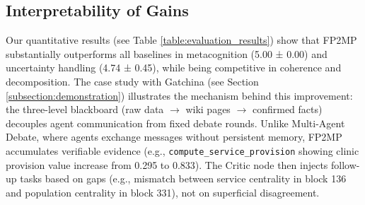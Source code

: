 \subsection{Interpretability of Gains}

Our quantitative results (see Table \ref{table:evaluation_results}) show that FP2MP substantially outperforms all baselines in metacognition (5.00 ± 0.00) and uncertainty handling (4.74 ± 0.45), while being competitive in coherence and decomposition.
The case study with Gatchina (see Section \ref{subsection:demonstration}) illustrates the mechanism behind this improvement: the three-level blackboard  (raw data $\rightarrow$ wiki pages $\rightarrow$ confirmed facts) decouples agent communication from fixed debate rounds.
Unlike Multi-Agent Debate, where agents exchange messages without persistent memory, FP2MP accumulates verifiable evidence (e.g., \texttt{compute\_service\_provision} showing clinic provision value increase from 0.295 to 0.833).
The Critic node then injects follow-up tasks based on gaps (e.g., mismatch between service centrality in block 136 and population centrality in block 331), not on superficial disagreement.